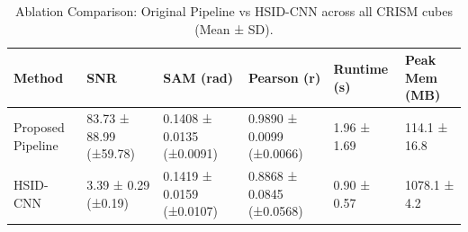 \begin{table}
\caption{Ablation Comparison: Original Pipeline vs HSID-CNN across all CRISM cubes (Mean ± SD).}
\label{tab:comparison}
\begin{tabular}{llllll}
\toprule
Method & SNR & SAM (rad) & Pearson (r) & Runtime (s) & Peak Mem (MB) \\
\midrule
Proposed Pipeline & 83.73 ± 88.99 (±59.78) & 0.1408 ± 0.0135 (±0.0091) & 0.9890 ± 0.0099 (±0.0066) & 1.96 ± 1.69 & 114.1 ± 16.8 \\
HSID-CNN & 3.39 ± 0.29 (±0.19) & 0.1419 ± 0.0159 (±0.0107) & 0.8868 ± 0.0845 (±0.0568) & 0.90 ± 0.57 & 1078.1 ± 4.2 \\
\bottomrule
\end{tabular}
\end{table}
